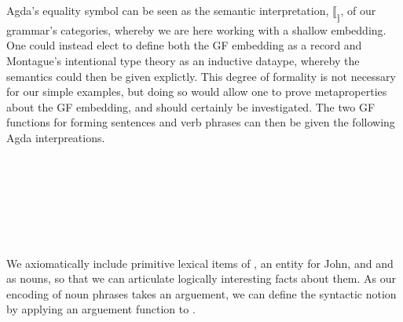 Agda's equality symbol can be seen as the semantic interpretation,
$\llbracket_\rrbracket$, of our grammar's categories, whereby we are here
working with a shallow embedding. One could instead elect to define both the GF
embedding as a record and Montague's intentional type theory as an inductive
dataype, whereby the semantics could then be given explictly. This degree of
formality is not necessary for our simple examples, but doing so would allow one
to prove metaproperties about the GF embedding, and should certainly be
investigated.
The two GF functions for forming sentences and verb phrases can
then be given the following Agda interpreations.

\begin{code}%
\>[0]\AgdaSpace{}%
\AgdaSymbol{:}\AgdaSpace{}%
\AgdaSpace{}%
\AgdaSpace{}%
\AgdaSpace{}%
\AgdaSpace{}%
\<%
\\
\>[0]\AgdaSpace{}%
\AgdaSpace{}%
\AgdaSpace{}%
\AgdaSymbol{=}\AgdaSpace{}%
\AgdaSpace{}%
\<%
\\
%
\\[\AgdaEmptyExtraSkip]%
\>[0]\AgdaSpace{}%
\AgdaSymbol{:}\AgdaSpace{}%
\AgdaSpace{}%
\AgdaSpace{}%
\AgdaSpace{}%
\AgdaSpace{}%
\<%
\\
\>[0]\AgdaSpace{}%
\AgdaSpace{}%
\AgdaSpace{}%
\AgdaSpace{}%
\AgdaSymbol{=}\AgdaSpace{}%
\AgdaSpace{}%
\AgdaSpace{}%
\<%
\end{code}

\begin{code}[hide]%
\>[0]\AgdaSpace{}%
\AgdaSymbol{:}\AgdaSpace{}%
\AgdaSpace{}%
\AgdaSpace{}%
\AgdaSpace{}%
\AgdaSpace{}%
\<%
\\
\>[0]\AgdaSpace{}%
\AgdaSpace{}%
\AgdaSpace{}%
\AgdaSymbol{=}\AgdaSpace{}%
\AgdaSpace{}%
\<%
\end{code}

We axiomatically include primitive lexical items of , an entity
 for John, and  and  as nouns, so that we can
articulate logically interesting facts about them. As our encoding of noun
phrases takes an arguement, we can define the syntactic notion  by
applying an arguement function to .

